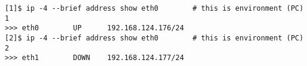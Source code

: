 \begin{lstfloat}
\begin{lstlisting}[style=mybashstyle,
caption={Ukázkový blok výpisu konzole},
label={sample:cmd}
]
[1]$ ip -4 --brief address show eth0        # this is environment (PC) 1
>>> eth0        UP      192.168.124.176/24
[2]$ ip -4 --brief address show eth0        # this is environment (PC) 2
>>> eth1        DOWN    192.168.124.177/24
\end{lstlisting}
\end{lstfloat}